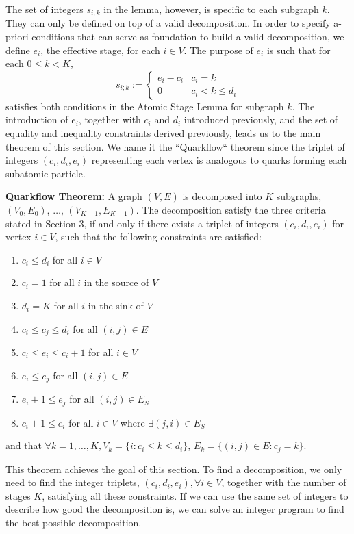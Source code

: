\documentclass[review]{siamart0216}
\begin{document}
The set of integers $s_{i;k}$ in the lemma, however, is specific to each
subgraph $k$.
They can only be defined on top of a valid decomposition.  In order
to specify a-priori conditions that can serve as foundation to build a
valid decomposition, we define $e_i$, the effective stage, for each $i\in V$.
The purpose of $e_i$ is such that for each $0\le k<K$,
\begin{equation} \label{s_i_e_i}
    s_{i;k} := \begin{cases}
        e_i - c_i & c_i = k \\
        0 & c_i < k \le d_i
    \end{cases}
\end{equation}
satisfies both conditions in the Atomic Stage Lemma for subgraph $k$.
The introduction of $e_i$, together with $c_i$ and $d_i$ introduced previously,
and the set of equality and inequality constraints derived previously,
leads us to the main theorem of this section.  We name it the ``Quarkflow``
theorem since the triplet of integers $(c_i,d_i,e_i)$ representing each
vertex is analogous to quarks forming each subatomic particle.

{\bf Quarkflow Theorem:} 
A graph $(V,E)$ is decomposed into $K$ subgraphs,
$(V_0,E_0)$, $\ldots$, $(V_{K-1},E_{K-1})$.
The decomposition satisfy the three criteria stated
in Section 3, if and only if there exists a triplet of integers
$(c_i, d_i, e_i)$ for vertex $i\in V$, such that the following constraints
are satisfied:
\begin{enumerate}
    \item $c_i \le d_i$ for all $i\in V$
    \item $c_i = 1$ for all $i$ in the source of $V$
    \item $d_i = K$ for all $i$ in the sink of $V$
    \item $c_i \le c_j \le d_i$ for all $(i,j)\in E$
    \item $c_i \le e_i \le c_i + 1$ for all $i\in V$
    \item $e_i \le e_j$ for all $(i,j)\in E$
    \item $e_i + 1 \le e_j$ for all $(i,j)\in E_S$
    \item $c_i + 1 \le e_i$ for all $i\in V$ where $\exists (j,i)\in E_S$
\end{enumerate}
and that $\forall k=1,\ldots,K,
V_k=\{i : c_i\le k\le d_i\}$, $E_k=\{(i,j)\in E : c_j=k\}$.

This theorem achieves the goal of this section. To find a decomposition,
we only need to find the integer triplets, $(c_i,d_i,e_i),\forall i\in V$,
together with the number of stages $K$, satisfying all these constraints.
If we can use the same set of integers
to describe how good the decomposition is, we can solve an integer program
to find the best possible decomposition.
\end{document}
